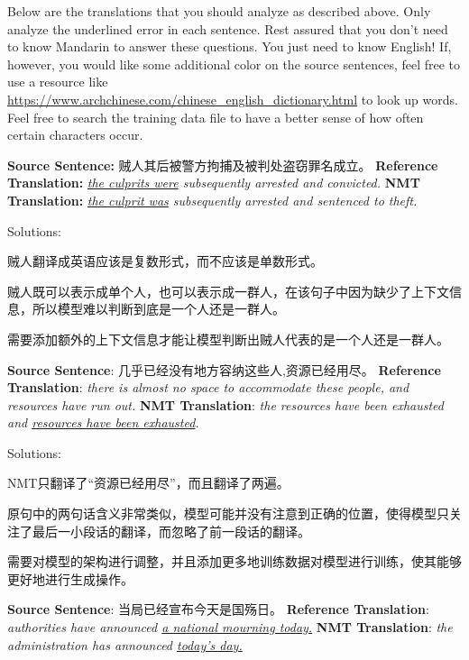 \begin{parts}
    Below are the translations that you should analyze as described above. Only analyze the underlined error in each sentence. Rest assured that you don't need to know Mandarin to answer these questions. You just need to know English! If, however, you would like some additional color on the source sentences, feel free to use a resource like \url{https://www.archchinese.com/chinese_english_dictionary.html} to look up words. Feel free to search the training data file to have a better sense of how often certain characters occur.

    \begin{subparts}
        \subpart[2]
        \textbf{Source Sentence:} 贼人其后被警方拘捕及被判处盗窃罪名成立。 \newline
        \textbf{Reference Translation:} \textit{\underline{the culprits were} subsequently arrested and convicted.}\newline
        \textbf{NMT Translation:} \textit{\underline{the culprit was} subsequently arrested and sentenced to theft.}
        
        {\color{red}Solutions:
        
        贼人翻译成英语应该是复数形式，而不应该是单数形式。

        贼人既可以表示成单个人，也可以表示成一群人，在该句子中因为缺少了上下文信息，所以模型难以判断到底是一个人还是一群人。

        需要添加额外的上下文信息才能让模型判断出贼人代表的是一个人还是一群人。
        }

        \subpart[2]
        \textbf{Source Sentence}: 几乎已经没有地方容纳这些人,资源已经用尽。\newline
        \textbf{Reference Translation}: \textit{there is almost no space to accommodate these people, and resources have run out.   }\newline
        \textbf{NMT Translation}: \textit{the resources have been exhausted and \underline{resources have been exhausted}.}
        
        {\color{red}Solutions:
        
        NMT只翻译了“资源已经用尽”，而且翻译了两遍。

        原句中的两句话含义非常类似，模型可能并没有注意到正确的位置，使得模型只关注了最后一小段话的翻译，而忽略了前一段话的翻译。

        需要对模型的架构进行调整，并且添加更多地训练数据对模型进行训练，使其能够更好地进行生成操作。
        }

        \subpart[2]
        \textbf{Source Sentence}: 当局已经宣布今天是国殇日。 \newline
        \textbf{Reference Translation}: \textit{authorities have announced \underline{a national mourning today.}}\newline
        \textbf{NMT Translation}: \textit{the administration has announced \underline{today's day.}}
        

\end{subparts}
\end{parts}
